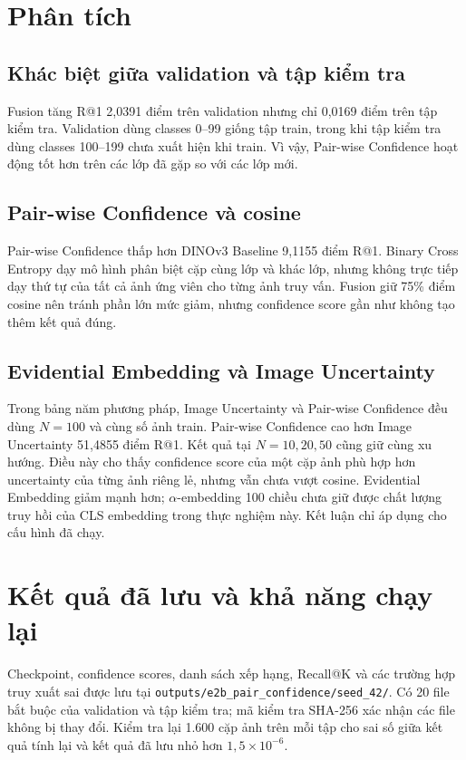 \documentclass[11pt,a4paper]{article}
\begin{document}
\section{Phân tích}
\subsection{Khác biệt giữa validation và tập kiểm tra}
Fusion tăng R@1 2,0391 điểm trên validation nhưng chỉ 0,0169 điểm trên tập
kiểm tra. Validation dùng classes 0--99 giống tập train, trong khi tập kiểm
tra dùng classes 100--199 chưa xuất hiện khi train. Vì vậy, Pair-wise
Confidence hoạt động tốt hơn trên các lớp đã gặp so với các lớp mới.

\subsection{Pair-wise Confidence và cosine}
Pair-wise Confidence thấp hơn DINOv3 Baseline 9,1155 điểm R@1. Binary Cross
Entropy dạy mô hình phân biệt cặp cùng lớp và khác lớp, nhưng không trực tiếp
dạy thứ tự của tất cả ảnh ứng viên cho từng ảnh truy vấn. Fusion giữ 75\%
điểm cosine nên tránh phần lớn mức giảm, nhưng confidence score gần như không
tạo thêm kết quả đúng.

\subsection{Evidential Embedding và Image Uncertainty}
Trong bảng năm phương pháp, Image Uncertainty và Pair-wise Confidence đều
dùng $N=100$ và cùng số ảnh train. Pair-wise Confidence cao hơn Image
Uncertainty 51,4855 điểm R@1. Kết quả tại $N=10,20,50$ cũng giữ cùng xu
hướng. Điều này cho thấy confidence score của một cặp ảnh phù hợp hơn
uncertainty của từng ảnh riêng lẻ, nhưng vẫn chưa vượt cosine. Evidential
Embedding giảm mạnh hơn;
$\alpha$-embedding 100 chiều chưa giữ được chất lượng truy hồi của CLS
embedding trong thực nghiệm này. Kết luận chỉ áp dụng cho cấu hình đã chạy.

\section{Kết quả đã lưu và khả năng chạy lại}
Checkpoint, confidence scores, danh sách xếp hạng, Recall@K và các trường hợp
truy xuất sai được lưu tại
\texttt{outputs/e2b\_pair\_confidence/seed\_42/}. Có 20 file bắt buộc của
validation và tập kiểm tra; mã kiểm tra SHA-256 xác nhận các file không bị
thay đổi. Kiểm tra lại 1.600 cặp ảnh trên mỗi tập cho sai số giữa kết quả tính
lại và kết quả đã lưu nhỏ hơn $1{,}5\times10^{-6}$.
\end{document}
